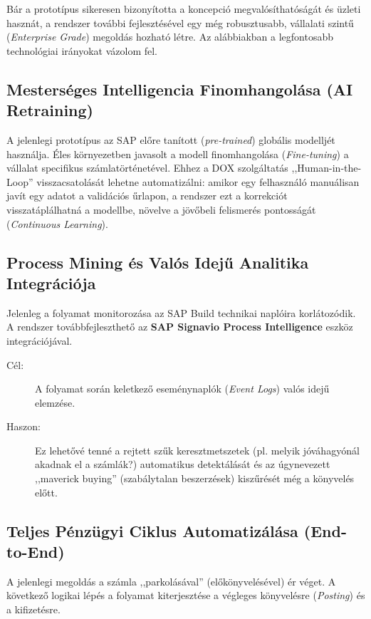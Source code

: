 Bár a prototípus sikeresen bizonyította a koncepció megvalósíthatóságát és üzleti hasznát, a rendszer további fejlesztésével egy még robusztusabb, vállalati szintű (\textit{Enterprise Grade}) megoldás hozható létre. Az alábbiakban a legfontosabb technológiai irányokat vázolom fel.


\subsection{Mesterséges Intelligencia Finomhangolása (AI Retraining)}
\label{ssec:future_ai_retraining}

A jelenlegi prototípus az SAP előre tanított (\textit{pre-trained}) globális modelljét használja. Éles környezetben javasolt a modell finomhangolása (\textit{Fine-tuning}) a vállalat specifikus számlatörténetével. Ehhez a DOX szolgáltatás ,,Human-in-the-Loop'' visszacsatolását lehetne automatizálni: amikor egy felhasználó manuálisan javít egy adatot a validációs űrlapon, a rendszer ezt a korrekciót visszatáplálhatná a modellbe, növelve a jövőbeli felismerés pontosságát (\textit{Continuous Learning}).


\subsection{Process Mining és Valós Idejű Analitika Integrációja}
\label{ssec:future_process_mining}

Jelenleg a folyamat monitorozása az SAP Build technikai naplóira korlátozódik. A rendszer továbbfejleszthető az \textbf{SAP Signavio Process Intelligence} eszköz integrációjával.

\begin{description}
    \item[Cél:] A folyamat során keletkező eseménynaplók (\textit{Event Logs}) valós idejű elemzése.
    \item[Haszon:] Ez lehetővé tenné a rejtett szűk keresztmetszetek (pl. melyik jóváhagyónál akadnak el a számlák?) automatikus detektálását és az úgynevezett ,,maverick buying'' (szabálytalan beszerzések) kiszűrését még a könyvelés előtt.
\end{description}


\subsection{Teljes Pénzügyi Ciklus Automatizálása (End-to-End)}
\label{ssec:future_e2e}

A jelenlegi megoldás a számla ,,parkolásával'' (előkönyvelésével) ér véget. A következő logikai lépés a folyamat kiterjesztése a végleges könyvelésre (\textit{Posting}) és a kifizetésre.

